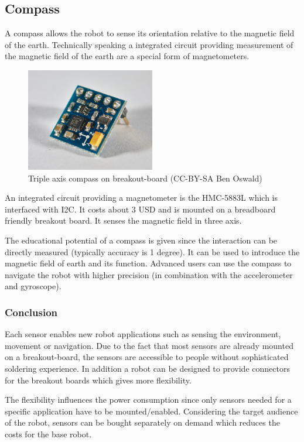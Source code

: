 \documentclass[11pt,a4paper]{article}
\begin{document}
\subsection{Compass}
A compass allows the robot to sense its orientation relative to the magnetic field of the earth. Technically speaking a integrated circuit providing measurement of the magnetic field of the earth are a special form of magnetometers.

\begin{figure}[h!]
  \centering
  \includegraphics[width=0.5\textwidth]{images/30_compass.jpg}
  \caption{Triple axis compass on breakout-board (CC-BY-SA Ben Oswald)}
\end{figure}

An integrated circuit providing a magnetometer is the HMC-5883L which is interfaced with I2C. It costs about 3 USD and is mounted on a breadboard friendly breakout board. It senses the magnetic field in three axis.


The educational potential of a compass is given since the interaction can be directly measured (typically accuracy is 1 degree). It can be used to introduce the magnetic field of earth and its function. Advanced users can use the compass to navigate the robot with higher precision (in combination with the accelerometer and gyroscope).
\subsubsection{Conclusion}
Each sensor enables new robot applications such as sensing the environment, movement or navigation. Due to the fact that most sensors are already mounted on a breakout-board, the sensors are accessible to people without sophisticated soldering experience. In addition a robot can be designed to provide connectors for the breakout boards which gives more flexibility.

The flexibility influences the power consumption since only sensors needed for a specific application have to be mounted/enabled. Considering the target audience of the robot, sensors can be bought separately on demand which reduces the costs for the base robot.
\end{document}
